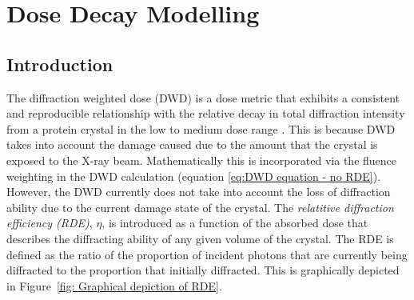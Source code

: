 \chapter{Dose Decay Modelling}
\label{chap:Dose Decay Modelling}

\section{Introduction}
\label{sec:Introduction}

The diffraction weighted dose (DWD) is a dose metric that exhibits a consistent and reproducible relationship with the relative decay in total diffraction intensity from a protein crystal in the low to medium dose range \cite{zeldin2013dwd}.
This is because DWD takes into account the damage caused due to the amount that the crystal is exposed to the X-ray beam.
Mathematically this is incorporated via the fluence weighting in the DWD calculation (equation \ref{eq:DWD equation - no RDE}).
However, the DWD currently does not take into account the loss of diffraction ability due to the current damage state of the crystal.
The \textit{relatitive diffraction efficiency (RDE)}, $\eta$, is introduced as a function of the absorbed dose that describes the diffracting ability of any given volume of the crystal.
The RDE is defined as the ratio of the proportion of incident photons that are currently being diffracted to the proportion that initially diffracted.
This is graphically depicted in Figure~\ref{fig: Graphical depiction of RDE}.
